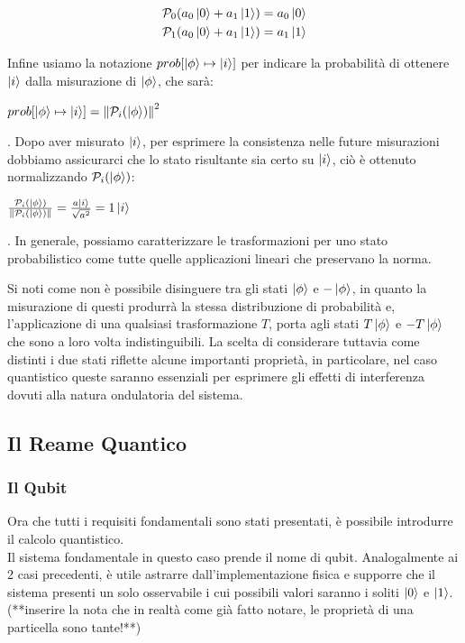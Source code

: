\documentclass[12pt,a4paper,openright]{report}
\newcommand{\norm}[1]{\left\lVert#1\right\rVert}
\begin{document}
    \begin{center}
        \begin{align*}
            &\mathcal{P}_0(a_0\ket0 + a_1\ket1) = a_0\ket0 \\
            &\mathcal{P}_1(a_0\ket0 + a_1\ket1) = a_1\ket1
        \end{align*}    
    \end{center}
Infine usiamo la notazione $prob[\ket{\phi} \mapsto \ket{i}]$ per indicare la probabilità di ottenere $\ket{i}$ dalla misurazione di $\ket{\phi}$, 
che sarà:
\begin{center}
    $prob[\ket{\phi} \mapsto \ket{i}] = \norm{\mathcal{P}_i(\ket{\phi})}^2$
\end{center}
. Dopo aver misurato $\ket{i}$, per esprimere la consistenza nelle future misurazioni dobbiamo assicurarci che lo stato risultante sia certo su $\ket{i}$,
ciò è ottenuto normalizzando $\mathcal{P}_i(\ket{\phi})$:
\begin{center}
    $\frac{\mathcal{P}_i(\ket{\phi})}{\norm{\mathcal{P}_i(\ket{\phi})}}=\frac{a\ket{i}}{\sqrt{a^2}}=1\ket{i}$
\end{center}
. In generale, possiamo caratterizzare le trasformazioni per uno stato probabilistico come tutte quelle applicazioni lineari che preservano la norma.\par
Si noti come non è possibile disinguere tra gli stati $\ket{\phi}$ e $-\ket{\phi}$, in quanto la misurazione di questi produrrà la stessa
distribuzione di probabilità e, l'applicazione di una qualsiasi trasformazione $T$, porta agli stati $T\ket{\phi}$ e $-T\ket{\phi}$ che sono a loro volta
indistinguibili. La scelta di considerare tuttavia come distinti i due stati riflette alcune importanti proprietà, in particolare, nel
caso quantistico queste saranno essenziali per esprimere gli effetti di interferenza dovuti alla natura ondulatoria del sistema.   

\subsection{Il Reame Quantico}
\subsubsection{Il Qubit}
Ora che tutti i requisiti fondamentali sono stati presentati, è possibile introdurre il calcolo quantistico.\\
Il sistema fondamentale in questo caso prende il nome di qubit. Analogalmente ai 2 casi precedenti, è utile astrarre dall'implementazione fisica
e supporre che il sistema presenti un solo osservabile i cui possibili valori saranno i soliti $\ket0$ e $\ket1$.(**inserire la nota che in realtà
come già fatto notare, le proprietà di una particella sono tante!**)
\end{document}
